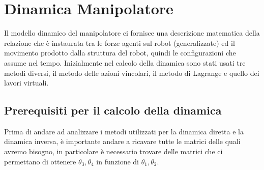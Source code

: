 \section{Dinamica Manipolatore}
Il modello dinamico del manipolatore ci fornisce una descrizione matematica della relazione che è instaurata tra le forze agenti sul robot (generalizzate) ed il movimento prodotto dalla struttura del robot, quindi le configurazioni che assume nel tempo. Inizialmente nel calcolo della dinamica sono stati usati tre metodi diversi, il metodo delle azioni vincolari, il metodo di Lagrange e quello dei lavori virtuali.
\subsection{Prerequisiti per il calcolo della dinamica}\label{sec:prerequisiti-dinamica}
Prima di andare ad analizzare i metodi utilizzati per la dinamica diretta e la dinamica inversa, è importante andare a ricavare tutte le matrici delle quali avremo bisogno, in particolare è necessario trovare delle matrici che ci permettano di ottenere $\theta_3, \theta_4$ in funzione di $\theta_1, \theta_2$.
